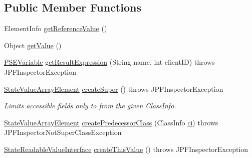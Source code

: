 \subsection*{Public Member Functions}
\begin{DoxyCompactItemize}
\item 
Element\+Info \hyperlink{classgov_1_1nasa_1_1jpf_1_1inspector_1_1server_1_1programstate_1_1_state_value_array_element_aad1395f06afed0ca4d42217f1f70fcd7}{get\+Reference\+Value} ()
\item 
Object \hyperlink{classgov_1_1nasa_1_1jpf_1_1inspector_1_1server_1_1programstate_1_1_state_value_array_element_a44723a2fd8b0a6ad58a853585c7c6ae4}{get\+Value} ()
\item 
\hyperlink{classgov_1_1nasa_1_1jpf_1_1inspector_1_1common_1_1pse_1_1_p_s_e_variable}{P\+S\+E\+Variable} \hyperlink{classgov_1_1nasa_1_1jpf_1_1inspector_1_1server_1_1programstate_1_1_state_value_array_element_a753673bf2c84cc5f9eb2ba458d835a08}{get\+Result\+Expression} (String name, int client\+ID)  throws J\+P\+F\+Inspector\+Exception 
\item 
\hyperlink{classgov_1_1nasa_1_1jpf_1_1inspector_1_1server_1_1programstate_1_1_state_value_array_element}{State\+Value\+Array\+Element} \hyperlink{classgov_1_1nasa_1_1jpf_1_1inspector_1_1server_1_1programstate_1_1_state_value_array_element_a28a643d26356e99acacac6411bcb55ac}{create\+Super} ()  throws J\+P\+F\+Inspector\+Exception 
\begin{DoxyCompactList}\small\item\em Limits accessible fields only to from the given Class\+Info. \end{DoxyCompactList}\item 
\hyperlink{classgov_1_1nasa_1_1jpf_1_1inspector_1_1server_1_1programstate_1_1_state_value_array_element}{State\+Value\+Array\+Element} \hyperlink{classgov_1_1nasa_1_1jpf_1_1inspector_1_1server_1_1programstate_1_1_state_value_array_element_a55bd476aeed2adcf1c1da70b2ed88794}{create\+Predecessor\+Class} (Class\+Info \hyperlink{classgov_1_1nasa_1_1jpf_1_1inspector_1_1server_1_1programstate_1_1_state_value_a0eb4aa1e630ed6372dcfb8c41ae7edc5}{ci})  throws J\+P\+F\+Inspector\+Not\+Super\+Class\+Exception 
\item 
\hyperlink{interfacegov_1_1nasa_1_1jpf_1_1inspector_1_1server_1_1programstate_1_1_state_readable_value_interface}{State\+Readable\+Value\+Interface} \hyperlink{classgov_1_1nasa_1_1jpf_1_1inspector_1_1server_1_1programstate_1_1_state_value_array_element_a1cf95f3d45408971104552e0a002702a}{create\+This\+Value} ()  throws J\+P\+F\+Inspector\+Exception 

\end{DoxyCompactItemize}
